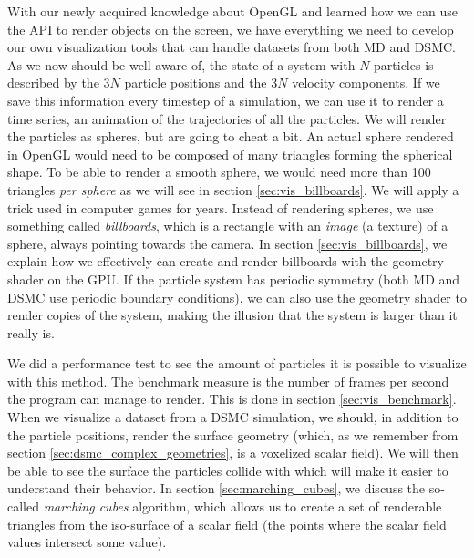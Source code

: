 With our newly acquired knowledge about OpenGL and learned how we can use the API to render objects on the screen, we have everything we need to develop our own visualization tools that can handle datasets from both MD and DSMC. As we now should be well aware of, the state of a system with $N$ particles is described by the $3N$ particle positions and the $3N$ velocity components. If we save this information every timestep of a simulation, we can use it to render a time series, an animation of the trajectories of all the particles. We will render the particles as spheres, but are going to cheat a bit. An actual sphere rendered in OpenGL would need to be composed of many triangles forming the spherical shape. To be able to render a smooth sphere, we would need more than 100 triangles \textit{per sphere} as we will see in section \ref{sec:vis_billboards}. We will apply a trick used in computer games for years. Instead of rendering spheres, we use something called \textit{billboards}, which is a rectangle with an \textit{image} (a texture) of a sphere, always pointing towards the camera. In section \ref{sec:vis_billboards}, we explain how we effectively can create and render billboards with the geometry shader on the GPU. If the particle system has periodic symmetry (both MD and DSMC use periodic boundary conditions), we can also use the geometry shader to render copies of the system, making the illusion that the system is larger than it really is.

We did a performance test to see the amount of particles it is possible to visualize with this method. The benchmark measure is the number of frames per second the program can manage to render. This is done in section \ref{sec:vis_benchmark}. When we visualize a dataset from a DSMC simulation, we should, in addition to the particle positions, render the surface geometry (which, as we remember from section \ref{sec:dsmc_complex_geometries}, is a voxelized scalar field). We will then be able to see the surface the particles collide with which will make it easier to understand their behavior. In section \ref{sec:marching_cubes}, we discuss the so-called \textit{marching cubes} algorithm, which allows us to create a set of renderable triangles from the iso-surface of a scalar field (the points where the scalar field values intersect some value).